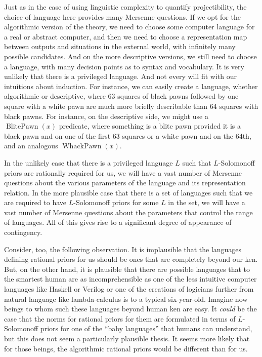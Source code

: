 Just as in the case of using linguistic complexity to quantify projectibility, the choice of language here provides many Mersenne
questions. If we opt for the algorithmic version of the theory, we need to choose some computer language for a real or abstract
computer, and then we need to choose a representation map between outputs and situations in the external world, with infinitely
many possible candidates. And on the more
descriptive versions, we still need to choose a language, with many decision points as to syntax and vocabulary. It is very unlikely 
that there is a privileged language. And not
every will fit with our intuitions about induction. For instance, we can easily create a language, whether algorithmic or descriptive,
where 63 squares of black pawns followed by one square with a white pawn are much more briefly describable than 64 squares with
black pawns. For instance, on the descriptive side, we might use a $\operatorname{BlitePawn}(x)$ predicate, where something is a blite pawn 
provided it is a black pawn and on one of the first 63 squares or a white pawn and on the 64th, and an analogous $\operatorname{WhackPawn}(x)$.

In the unlikely case that there is a privileged language $L$ such that $L$-Solomonoff priors are rationally required for us,
we will have a vast number of Mersenne questions about the various parameters of the language and its representation relation.
In the more plausible case that there is a set of languages such that we are required to have $L$-Solomonoff priors for some $L$
in the set, we will have a vast number of Mersenne questions about the parameters that control the range of languages. All of this
gives rise to a significant degree of appearance of contingency.

Consider, too, the following observation. It is implausible that the languages defining rational priors for us
should be ones that are completely beyond our ken. But, on the other hand, it is plausible that there are possible
languages that to the smartest human are as incomprehensible as one of the less intuitive computer languages like
Haskell or Verilog or one of the creations of logicians further from natural language like lambda-calculus is to a typical
six-year-old. Imagine now beings to whom such these languages beyond human ken are easy. It \textit{could} be the case that
the norms for rational priors for them are formulated in terms of $L$-Solomonoff priors for one of the ``baby languages''
that humans can understand, but this does not seem a particularly plausible thesis. It seems more likely that for those
beings, the algorithmic rational priors would be different than for us. 


